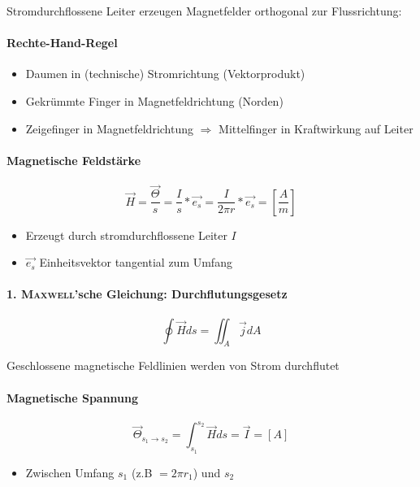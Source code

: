 Stromdurchflossene Leiter erzeugen Magnetfelder orthogonal zur Flussrichtung:

\paragraph{Rechte-Hand-Regel}

\begin{itemize}
  \item Daumen in (technische) Stromrichtung (Vektorprodukt)
  \item Gekrümmte Finger in Magnetfeldrichtung (Norden)
  \item Zeigefinger in Magnetfeldrichtung $\Rightarrow$ Mittelfinger in Kraftwirkung auf Leiter
\end{itemize}

\paragraph{Magnetische Feldstärke}

$$\vec{H} = \frac{\vec{\Theta}}{s} = \frac{I}{s} * \vec{e_s} = \frac{I}{2\pi r} * \vec{e_s} = \left[\frac{A}{m}\right]$$

\begin{itemize}
  \item Erzeugt durch stromdurchflossene Leiter $I$
  \item $\vec{e_s}$ Einheitsvektor tangential zum Umfang
\end{itemize}

\paragraph{1. \textsc{Maxwell}'sche Gleichung: Durchflutungsgesetz}

$$\oint \vec{H} ds = \iint_A \vec{j} dA$$

Geschlossene magnetische Feldlinien werden von Strom durchflutet

\paragraph{Magnetische Spannung}

$$\vec{\Theta}_{s_1 \rightarrow s_2} = \int_{s_1}^{s_2} \vec{H} ds = \vec{I} = [A]$$

\begin{itemize}
  \item Zwischen Umfang $s_1$ (z.B $=2\pi r_1$) und $s_2$
\end{itemize}

